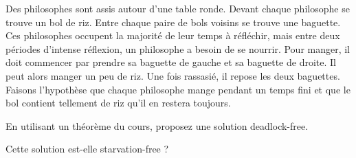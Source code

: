 
\begingroup

\begin{exercice}
  \label{exo:blocking/philosophers}

  Des philosophes sont assis autour d'une table ronde. Devant
  chaque philosophe se trouve un bol de riz. Entre chaque paire de bols voisins
  se trouve une baguette. Ces philosophes occupent la
  majorité de leur temps à réfléchir, mais entre deux périodes
  d'intense réflexion, un philosophe a besoin de se nourrir. Pour
  manger, il doit commencer par prendre sa baguette de gauche et sa
  baguette de droite. Il peut alors manger un peu de riz. Une fois rassasié,
  il repose les deux baguettes. Faisons l'hypothèse que chaque
  philosophe mange pendant un temps fini et que le bol contient
  tellement de riz qu'il en restera toujours.
  
  \begin{question}
  \item En utilisant un théorème du cours, proposez une solution deadlock-free. 
  \item Cette solution est-elle starvation-free ?
  \end{question}

\end{exercice}

\endgroup
\endinput
